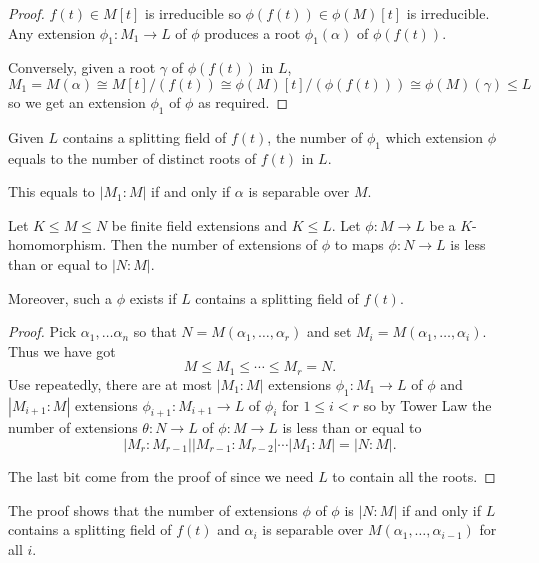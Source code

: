 \documentclass[a4paper]{article}
\begin{document}
\begin{proof}
  \(f(t) \in M[t]\) is irreducible so \(\phi(f(t)) \in \phi(M)[t]\) is irreducible. Any extension \(\phi_1: M_1 \to L\) of \(\phi\) produces a root \(\phi_1(\alpha)\) of \(\phi(f(t))\).

  Conversely, given a root \(\gamma\) of \(\phi(f(t))\) in \(L\),
  \[
    M_1 = M(\alpha) \cong M[t]/(f(t)) \cong \phi(M)[t]/(\phi(f(t))) \cong \phi(M)(\gamma) \leq L
  \]
  so we get an extension \(\phi_1\) of \(\phi\) as required.
\end{proof}

\begin{corollary}
  Given \(L\) contains a splitting field of \(f(t)\), the number of \(\phi_1\) which extension \(\phi\) equals to the number of distinct roots of \(f(t)\) in \(L\).

  This equals to \(|M_1:M|\) if and only if \(\alpha\) is separable over \(M\).
\end{corollary}

\begin{corollary}
  \label{cor:homomorphic extension of finite extension}
  Let \(K \leq M \leq N\) be finite field extensions and \(K \leq L\). Let \(\phi: M \to L\) be a \(K\)-homomorphism. Then the number of extensions of \(\phi\) to maps \(\phi: N \to L\) is less than or equal to \(|N:M|\).

  Moreover, such a \(\phi\) exists if \(L\) contains a splitting field of \(f(t)\).
\end{corollary}

\begin{proof}
  Pick \(\alpha_1, \dots \alpha_n\) so that \(N = M(\alpha_1, \dots, \alpha_r)\) and set \(M_i = M(\alpha_1, \dots, \alpha_i)\). Thus we have got
  \[
    M \leq M_1 \leq \cdots \leq M_r = N.
  \]
  Use  repeatedly, there are at most \(|M_1:M|\) extensions \(\phi_1: M_1 \to L\) of \(\phi\) and \(|M_{i + 1}:M|\) extensions \(\phi_{i + 1}: M_{i + 1} \to L\) of \(\phi_i\) for \(1 \leq i < r\) so by Tower Law the number of extensions \(\theta: N \to L\) of \(\phi: M \to L\) is less than or equal to
  \[
    |M_r:M_{r - 1}||M_{r - 1}:M_{r - 2}|\cdots|M_1:M| = |N:M|.
  \]

  The last bit come from the proof of  since we need \(L\) to contain all the roots.
\end{proof}

\begin{remark}
  The proof shows that the number of extensions \(\phi\) of \(\phi\) is \(|N:M|\) if and only if \(L\) contains a splitting field of \(f(t)\) and \(\alpha_i\) is separable over \(M(\alpha_1, \dots, \alpha_{i - 1})\) for all \(i\).
\end{remark}
\end{document}

